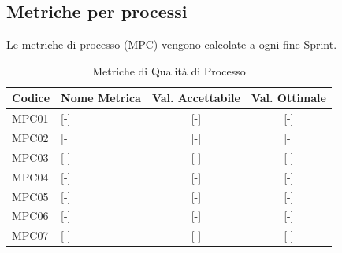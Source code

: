\subsection{Metriche per processi}
Le metriche di processo (MPC) vengono calcolate a ogni fine Sprint.

\begin{table}[H]
	\centering
	\renewcommand{\arraystretch}{1.3}
	\begin{tabularx}{\textwidth}{|l|X|c|c|}
		\hline
		\rowcolor{primarycolor!10}
		\textbf{Codice} & \textbf{Nome Metrica} & \textbf{Val. Accettabile} & \textbf{Val. Ottimale} \\
		\hline
		MPC01 & [-] & [-] & [-] \\
		\hline
		MPC02 & [-] & [-] & [-] \\
		\hline
		MPC03 & [-] & [-] & [-] \\
		\hline
		MPC04 & [-] & [-] & [-] \\
		\hline
		MPC05 & [-] & [-] & [-] \\
		\hline
		MPC06 & [-] & [-] & [-] \\
		\hline
		MPC07 & [-] & [-] & [-] \\
		\hline
	\end{tabularx}
	\caption{Metriche di Qualità di Processo}
\end{table}